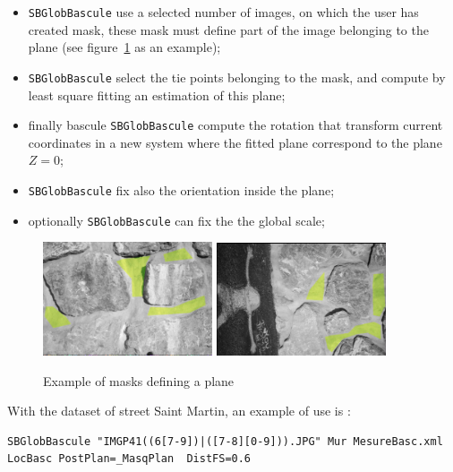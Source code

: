 \begin{itemize}
   \item {\tt SBGlobBascule} use a selected number of images, on which the
         user has created mask, these mask must define part of the image
         belonging to the plane (see figure~\ref{FIG:MaskPlane:StMartin} as an
         example);

   \item {\tt SBGlobBascule} select the tie points belonging to the mask, and
         compute by least square fitting an estimation of this  plane;


   \item finally bascule {\tt SBGlobBascule} compute the rotation that transform
         current coordinates in a new system where the fitted plane correspond to
         the plane $Z=0$;

    \item {\tt SBGlobBascule}  fix  also the orientation inside the plane;

    \item optionally {\tt SBGlobBascule}  can fix the  the global scale;
\end{itemize}


\begin{figure}[H]
\begin{center}
\includegraphics[width=50mm]{FIGS/MurSaintMartin/Plan1.jpg}
\includegraphics[width=50mm]{FIGS/MurSaintMartin/Plan2.jpg}
\end{center}
\caption{Example of masks defining a plane}
\label{FIG:MaskPlane:StMartin}
\end{figure}


With the dataset of street Saint Martin, an example of use is :

\begin{verbatim}
SBGlobBascule "IMGP41((6[7-9])|([7-8][0-9])).JPG" Mur MesureBasc.xml  LocBasc PostPlan=_MasqPlan  DistFS=0.6
\end{verbatim}

